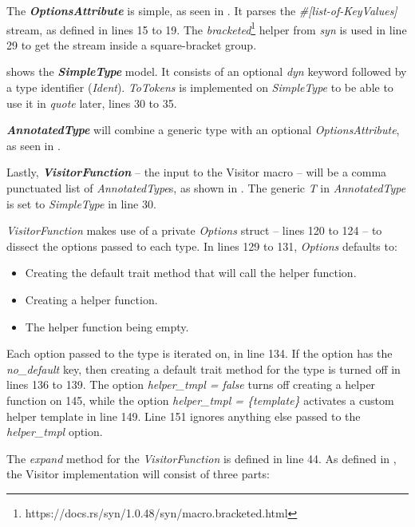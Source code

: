 The \textbf{\textit{OptionsAttribute}} is simple, as seen in .
It parses the \textit{\#[list-of-KeyValues]} stream, as defined in lines 15 to 19.
The \textit{bracketed}\footnote{https://docs.rs/syn/1.0.48/syn/macro.bracketed.html} helper from \textit{syn} is used in line 29 to get the stream inside a square-bracket group.

 shows the \textbf{\textit{SimpleType}} model.
It consists of an optional \textit{dyn} keyword followed by a type identifier (\textit{Ident}).
\textit{ToTokens} is implemented on \textit{SimpleType} to be able to use it in \textit{quote} later, lines 30 to 35.

\textbf{\textit{AnnotatedType}} will combine a generic type with an optional \textit{OptionsAttribute}, as seen in .


Lastly, \textbf{\textit{VisitorFunction}} -- the input to the Visitor macro -- will be a comma punctuated list of \textit{AnnotatedType}s, as shown in .
The generic \textit{T} in \textit{AnnotatedType} is set to \textit{SimpleType} in line 30.

\textit{VisitorFunction} makes use of a private \textit{Options} struct -- lines 120 to 124 -- to dissect the options passed to each type.
In lines 129 to 131, \textit{Options} defaults to:

\begin{itemize}
	\item Creating the default trait method that will call the helper function.
	\item Creating a helper function.
	\item The helper function being empty.
\end{itemize}

Each option passed to the type is iterated on, in line 134.
If the option has the \textit{no\_default} key, then creating a default trait method for the type is turned off in lines 136 to 139.
The option \textit{helper\_tmpl = false} turns off creating a helper function on 145, while the option \textit{helper\_tmpl = \{template\}} activates a custom helper template in line 149.
Line 151 ignores anything else passed to the \textit{helper\_tmpl} option.

The \textit{expand} method for the \textit{VisitorFunction} is defined in line 44.
As defined in , the Visitor implementation will consist of three parts:

